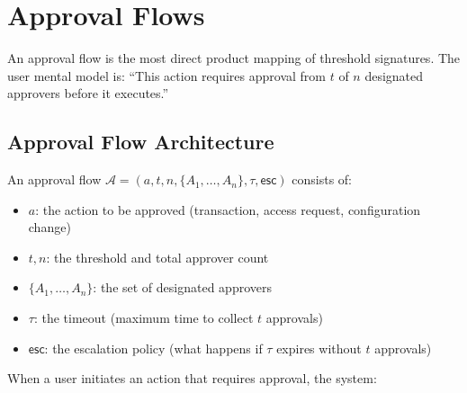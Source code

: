 

\section{Approval Flows}
\label{sec:approval}

An approval flow is the most direct product mapping of threshold signatures.
The user mental model is: ``This action requires approval from $t$ of $n$
designated approvers before it executes.''

\subsection{Approval Flow Architecture}

\begin{definition}
An approval flow $\mathcal{A} = (a, t, n, \{A_1, \ldots, A_n\}, \tau, \mathsf{esc})$
consists of:
\begin{itemize}
    \item $a$: the action to be approved (transaction, access request, configuration change)
    \item $t, n$: the threshold and total approver count
    \item $\{A_1, \ldots, A_n\}$: the set of designated approvers
    \item $\tau$: the timeout (maximum time to collect $t$ approvals)
    \item $\mathsf{esc}$: the escalation policy (what happens if $\tau$ expires without $t$ approvals)
\end{itemize}
\end{definition}

When a user initiates an action that requires approval, the system:

